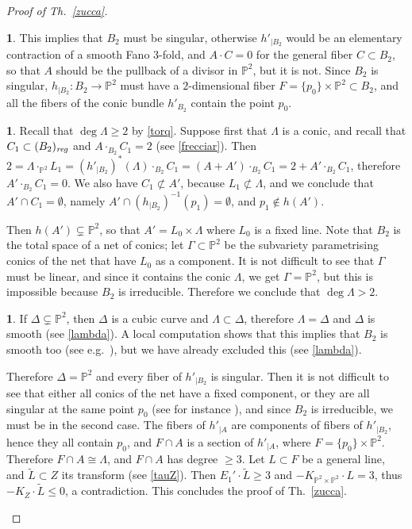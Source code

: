 \documentclass[a4paper,12pt]{amsart}
\theoremstyle{definition}
\newtheorem{prg}[thm]{}
\numberwithin{figure}{section}
\numberwithin{table}{section}
\newcommand{\w}{\widetilde}
\newcommand{\pr}{\mathbb{P}}
\newcommand{\reg}{\text{\it reg}}
\begin{document}
\begin{proof}[Proof of Th.~\ref{zucca}]
\begin{prg}
This implies that $B_2$ must be singular, otherwise $h'_{|B_2}$ would be an elementary contraction of a smooth Fano $3$-fold, and $A\cdot C=0$ for the general fiber $C\subset B_2$, so that $A$ should be the pullback of a divisor in $\pr^2$, but it is not. Since $B_2$ is singular,  $h_{|B_2}\colon B_2 \to\pr^2$ must have a $2$-dimensional fiber $F=\{p_0\}\times\pr^2\subset B_2$, and all the fibers of the conic bundle $h'_{B_2}$  contain the point $p_0$.
\end{prg}  
 \begin{prg}
Recall that $\deg\Lambda\geq 2$ by \ref{torq}.
   Suppose first that $\Lambda$ is a conic, and recall that $C_1\subset (B_2)_{\reg}$ and $A\cdot_{B_2} C_1=2$ (see \ref{frecciar}). Then
 $2=\Lambda\cdot_{\pr^2} L_1=(h'_{|B_2})^*(\Lambda)\cdot_{B_2} C_1=(A+A')\cdot_{B_2} C_1=2+A'\cdot_{B_2} C_1$, therefore $A'\cdot_{B_2} C_1=0$. We also have $C_1\not\subset A'$, because $L_1\not\subset\Lambda$, and we conclude that $A'\cap C_1=\emptyset$, namely $A'\cap (h_{|B_2})^{-1}(p_1)=\emptyset$, and $p_1\not\in h(A')$.

 Then $h(A')\subsetneq\pr^2$, so that $A'=L_0\times\Lambda$ where $L_0$ is a fixed line. 
 Note that $B_2$ is the total space of a net of conics; let $\Gamma\subset\pr^2$ be the subvariety parametrising conics of the net that have $L_0$ as a component. It is not difficult to see that
 $\Gamma$ must be linear, and since it contains the conic $\Lambda$, we get $\Gamma=\pr^2$, but this is impossible because $B_2$ is irreducible.
Therefore we conclude that
  $\deg\Lambda>2$.
\end{prg}  
 \begin{prg}
If  $\Delta\subsetneq\pr^2$,  then $\Delta$ is a cubic curve and $\Lambda\subset\Delta$, therefore $\Lambda=\Delta$ and $\Delta$ is smooth (see \ref{lambda}).
A local computation shows that this implies that $B_2$ is smooth too (see e.g.\ \cite[Rem.~3.9 and its proof]{3folds}), but we have already excluded this (see \ref{lambda}).

Therefore $\Delta=\pr^2$ and every fiber of $h'_{|B_2}$ is singular. Then it is not difficult to see that either all conics of the net have a fixed component, or they are all singular at the same point $p_0$ (see for instance \cite[Table 1]{nets}), and
since $B_2$ is irreducible, we must be in the second case.
The fibers of $h'_{|A}$ are components of fibers of $h'_{|B_2}$, hence they all contain $p_0$, and $F\cap A$ is a section of $h'_{|A}$, where $F=\{p_0\}\times\pr^2$. Therefore $F\cap A\cong\Lambda$, and
 $F\cap A$ has degree $\geq 3$. Let $L \subset F$ be a general line, and $\w{L}\subset Z$ its transform (see \ref{tauZ}). Then $E_1'\cdot\w{L}\geq 3$ and $-K_{\pr^2\times\pr^2}\cdot L=3$, thus $-K_Z\cdot\w{L}\leq 0$, a contradiction.
  This concludes the proof of Th.~\ref{zucca}.
\qedhere
\end{prg}  
\end{proof}
\end{document}
